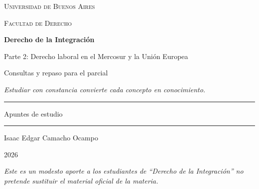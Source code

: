 \documentclass[12pt,oneside]{book}
\newcommand{\universidad}{Universidad de Buenos Aires}
\newcommand{\facultad}{Facultad de Derecho}
\newcommand{\materia}{Derecho de la Integración}
\newcommand{\titulo}{Parte 2: Derecho laboral en el Mercosur y la Unión Europea}
\newcommand{\subtitulo}{Consultas y repaso para el parcial}
\newcommand{\autor}{Isaac Edgar Camacho Ocampo}
\newcommand{\anio}{2026}
\begin{document}
\begin{titlepage}

\thispagestyle{empty}

\begin{center}

\vspace*{1cm}

{\large \textsc{\universidad}}

\vspace{0.2cm}

{\large \textsc{\facultad}}

\vspace{3cm}

{\Huge \textbf{\materia}}

\vspace{1cm}

{\LARGE \titulo}

\vspace{0.4cm}

{\large \subtitulo}

\vspace{0.8cm}

\textit{Estudiar con constancia convierte cada concepto en conocimiento.}

\vspace{1.2cm}

\rule{0.70\textwidth}{0.5pt}

\vspace{0.5cm}

{\large Apuntes de estudio}

\vspace{0.5cm}

\rule{0.70\textwidth}{0.5pt}

\vfill

{\large \autor}

\vspace{0.3cm}

{\large \anio}

\end{center}

\vfill

\begin{flushleft}
\textit{Este es un modesto aporte a los estudiantes de ``\materia'' no pretende sustituir el material oficial de la materia.}
\end{flushleft}

\end{titlepage}
\end{document}
